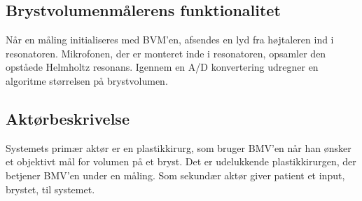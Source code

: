 	
		\subsection{Brystvolumenmålerens funktionalitet}
		Når en måling initialiseres med BVM'en, afsendes en lyd fra højtaleren ind i resonatoren. Mikrofonen, der er monteret inde i resonatoren, opsamler den opståede Helmholtz resonans. Igennem en A/D konvertering udregner en algoritme størrelsen på brystvolumen. 
	
		\subsection{Aktørbeskrivelse}
		Systemets primær aktør er en plastikkirurg, som bruger BMV'en når han ønsker et objektivt mål for volumen på et bryst. Det er udelukkende plastikkirurgen, der  betjener BMV'en under en måling. Som sekundær aktør giver patient et input, brystet, til systemet.
		 

